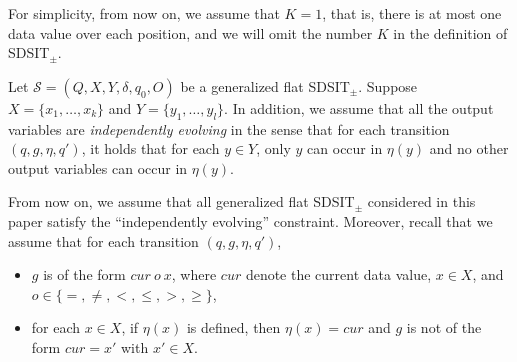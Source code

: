 \documentclass[runningheads,a4paper]{llncs}
\def\Ss{{\mathcal{S} }}
\newcommand\intnum{{\mathbb{Z} }}
\begin{document}


For simplicity, from now on, we assume that $K=1$, that is, there is at most one data value over each position, and we will omit the number $K$ in the definition of SDSIT$_{\pm}$.


Let $\Ss=(Q, X, Y, \delta, q_0, O)$ be a generalized flat SDSIT$_{\pm}$.  Suppose $X=\{x_1,\dots,x_k\}$ and $Y=\{y_1,\dots,y_l\}$. In addition, we assume that all the output variables are \emph{independently evolving} in the sense that for each transition $(q, g, \eta, q')$, it holds that for each $y \in Y$, only $y$ can occur in $\eta(y)$ and no other output variables can occur in $\eta(y)$.  

From now on, we assume that all generalized flat SDSIT$_{\pm}$ considered in this paper satisfy the  ``independently evolving'' constraint. Moreover, recall that we assume that for each transition $(q,g,\eta,q')$, 
\begin{itemize}
\item $g$ is of the form $cur\ o\ x $, where $cur$ denote the current data value, $x \in X$,  and $o \in \{=,\neq,<, \le, >, \ge\}$,
%
\item for each $x \in X$, if $\eta(x)$ is defined, then $\eta(x)=cur$ and  $g$ is not of the form $cur = x'$ with $x' \in X$. 
\end{itemize}

\end{document}
